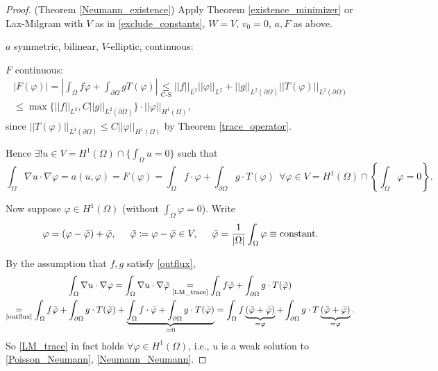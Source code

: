 \documentclass[12pt]{article}
\theoremstyle{definition}
\begin{document}
\begin{proof}
(Theorem \ref{Neumann_existence}) Apply Theorem \ref{existence_minimizer} or Lax-Milgram with $V$ as in \eqref{exclude_constants}, $W=V$, $v_0=0$, $a,F$ as above.

$a$ symmetric, bilinear, $V$-elliptic, continuous: \checkmark

$F$ continuous:
\begin{multline*}
\big|F(\varphi)\big|=\left|\int_{\Omega}f\varphi+\int_{\partial\Omega}gT(\varphi)\right|\underset{\text{C-S}}{\leq}||f||_{L^2}||\varphi||_{L^2}+||g||_{L^2(\partial\Omega)}\big|\big|T(\varphi)\big|\big|_{L^2(\partial\Omega)}\\
\leq\max\big\{||f||_{L^2},C||g||_{L^2(\partial\Omega)}\big\}\cdot||\varphi||_{H^1(\Omega)},
\end{multline*}
since $||T(\varphi)||_{L^2(\partial\Omega)}\leq C||\varphi||_{H^1(\Omega)}$ by Theorem \ref{trace_operator}.

Hence $\exists!u\in V=H^1(\Omega)\cap\{\int_{\Omega}u=0\}$ such that
\begin{equation}\tag{W}\label{LM_trace}
\int_{\Omega}\nabla u\cdot\nabla\varphi=a(u,\varphi)=F(\varphi)=\int_{\Omega}f\cdot\varphi+\int_{\partial\Omega}g\cdot T(\varphi)\ \ \forall\varphi\in V=H^1(\Omega)\cap\left\{\int_{\Omega}\varphi=0\right\}.
\end{equation}

Now suppose $\varphi\in H^1(\Omega)$ (without $\int_{\Omega}\varphi=0$). Write
\[\varphi=(\varphi-\bar{\varphi})+\bar{\varphi},\hspace{5mm}\tilde{\varphi}\coloneqq\varphi-\bar{\varphi}\in V,\hspace{5mm}\bar{\varphi}=\frac{1}{|\Omega|}\int_{\Omega}\varphi\equiv\text{constant}.\]

By the assumption that $f,g$ satisfy \eqref{outflux},
\begin{multline*}
\int_{\Omega}\nabla u\cdot\nabla\varphi=\int_{\Omega}\nabla u\cdot\nabla\tilde{\varphi}\underset{\text{\eqref{LM_trace}}}{=}\int_{\Omega}f\tilde{\varphi}+\int_{\partial\Omega}g\cdot T(\tilde{\varphi})\\
\underset{\text{\eqref{outflux}}}{=}\int_{\Omega}f\tilde{\varphi}+\int_{\partial\Omega}g\cdot T(\tilde{\varphi})+\underbrace{\int_{\Omega}f\cdot\bar{\varphi}+\int_{\partial\Omega}g\cdot T(\bar{\varphi})}_{=0}=\int_{\Omega}f\underbrace{(\tilde{\varphi}+\bar{\varphi})}_{=\varphi}+\int_{\partial\Omega}g\cdot T\underbrace{(\tilde{\varphi}+\bar{\varphi})}_{=\varphi}.
\end{multline*}
So \eqref{LM_trace} in fact holds $\forall\varphi\in H^1(\Omega)$, i.e., $u$ is a weak solution to \eqref{Poisson_Neumann}, \eqref{Neumann_Neumann}.
\end{proof}
\end{document}
